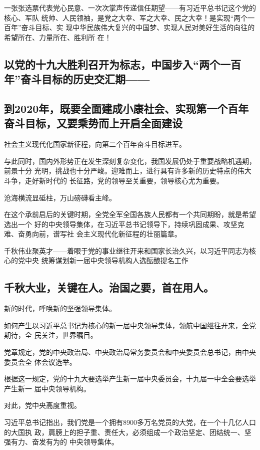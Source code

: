 \documentclass[11pt]{ctexart}
\begin{document}
{{{{一张张选票代表党心民意、一次次掌声传递信任期望——有习近平总书记这个党的核心、军队
统帅、人民领袖，是党之大幸、军之大幸、民之大幸！是实现“两个一百年”奋斗目标、实
现中华民族伟大复兴的中国梦、实现人民对美好生活的向往的希望所在、力量所在、胜利所
在！

\subsection{以党的十九大胜利召开为标志，中国步入“两个一百年”奋斗目标的历史交汇期——}
\label{sec:orgd1fe812}

\subsection{到2020年，既要全面建成小康社会、实现第一个百年奋斗目标，又要乘势而上开启全面建设}
\label{sec:orgef31654}
社会主义现代化国家新征程，向第二个百年奋斗目标进军。

与此同时，国内外形势正在发生深刻复杂变化，我国发展仍处于重要战略机遇期，前景十分
光明，挑战也十分严峻。迎难而上，进行具有许多新的历史特点的伟大斗争，走好新时代的
长征路，党的领导至关重要，领导核心尤为重要。

沧海横流显砥柱，万山磅礴看主峰。

在这个承前启后的关键时期，全党全军全国各族人民都有一个共同期盼，就是希望选出一个
好的中央领导集体，在习近平总书记领导下，持续巩固成果、攻坚克难、奋勇向前，谱写社
会主义现代化新征程的壮丽篇章。

千秋伟业聚英才——着眼于党的事业继往开来和国家长治久兴，以习近平同志为核心的党中央
统筹谋划新一届中央领导机构人选酝酿提名工作

\subsection{千秋大业，关键在人。治国之要，首在用人。}
\label{sec:org6a9d2e8}

新的时代，呼唤新的坚强领导集体。

如何产生以习近平总书记为核心的新一届中央领导集体，领航中国继往开来，全党期待，全
民关注，世界瞩目。

党章规定，党的中央政治局、中央政治局常务委员会和中央委员会总书记，由中央委员会全
体会议选举。

根据这一规定，党的十九大要选举产生新一届中央委员会，十九届一中全会要选举产生新一
届中央领导机构。

对此，党中央高度重视。

习近平总书记指出，我们党是一个拥有8900多万名党员的大党，在一个十几亿人口的大国执
政，肩膀上的担子重、责任大，必须组成一个政治坚定、团结统一、坚强有力、奋发有为的
中央领导集体。

}}}}
\end{document}
